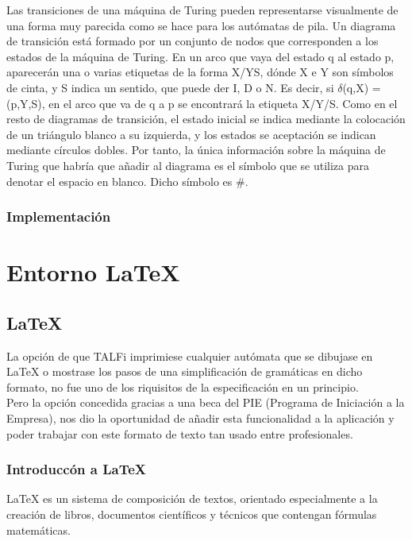 \documentclass[12pt,a4paper,spanish]{book}
\begin{document}
Las transiciones de una m\'aquina de Turing pueden representarse visualmente de
una forma muy parecida como se hace para los aut\'omatas de pila. Un diagrama de
transici\'on est\'a formado por un conjunto de nodos que corresponden a los estados
de la m\'aquina de Turing. En un arco que vaya del estado q al estado p, aparecer\'an
una o varias etiquetas de la forma X/YS, d\'onde X e Y son s\'imbolos de cinta, y S
indica un sentido, que puede der I, D o N. Es decir, si $\delta$(q,X) = (p,Y,S), en el
arco que va de q a p se encontrar\'a la etiqueta X/Y/S.
Como en el resto de diagramas de transici\'on, el estado inicial se indica mediante la
colocaci\'on de un tri\'angulo blanco a su izquierda, y los estados se aceptaci\'on se
indican mediante c\'irculos dobles.
\newpage
Por tanto, la \'unica informaci\'on sobre la m\'aquina
de Turing que habr\'ia que a\~nadir al diagrama es el s\'imbolo que se utiliza para
denotar el espacio en blanco. Dicho s\'imbolo es \#.

\subsection{Implementaci\'on}

\chapter{Entorno \LaTeX{}}
\section{\LaTeX{}}

La opci\'on de que TALFi imprimiese cualquier aut\'omata que se dibujase en {\LaTeX{}} o mostrase los pasos de una simplificaci\'on de gram\'aticas en dicho formato, no fue uno de los riquisitos de la especificaci\'on en un principio.\\
Pero la opci\'on concedida gracias a una beca del PIE (Programa de Iniciaci\'on a la Empresa), nos dio la oportunidad de a\~nadir esta funcionalidad a la aplicaci\'on y poder trabajar con este formato de texto tan usado entre profesionales.\\
\subsection{Introducc\'on a \LaTeX{}}
\LaTeX{} es un sistema de composici\'on de textos, orientado especialmente a la creaci\'on de libros, documentos cient\'ificos y t\'ecnicos que contengan f\'ormulas matem\'aticas.
\end{document}

